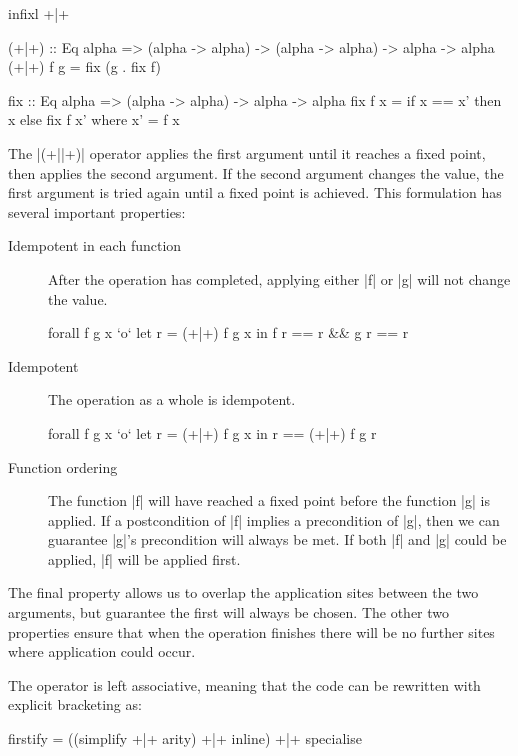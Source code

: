 \documentclass[preprint]{sigplanconf}
\begin{document}
\begin{code}
infixl +|+

(+|+) :: Eq alpha => (alpha -> alpha) -> (alpha -> alpha) -> alpha -> alpha
(+|+) f g = fix (g . fix f)

fix :: Eq alpha => (alpha -> alpha) -> alpha -> alpha
fix f x = if x == x' then x else fix f x'
    where x' = f x
\end{code}

The |(+||+)| operator applies the first argument until it reaches a fixed point, then applies the second argument. If the second argument changes the value, the first argument is tried again until a fixed point is achieved. This formulation has several important properties:

\begin{description}
\item[Idempotent in each function] After the operation has completed, applying either |f| or |g| will not change the value.

\begin{code}
forall f g x `o` let r = (+|+) f g x in f r == r && g r == r
\end{code}

\item[Idempotent] The operation as a whole is idempotent.

\begin{code}
forall f g x `o` let r = (+|+) f g x in r == (+|+) f g r
\end{code}

\item[Function ordering] The function |f| will have reached a fixed point before the function |g| is applied. If a postcondition of |f| implies a precondition of |g|, then we can guarantee |g|'s precondition will always be met. If both |f| and |g| could be applied, |f| will be applied first.
\end{description}

The final property allows us to overlap the application sites between the two arguments, but guarantee the first will always be chosen. The other two properties ensure that when the operation finishes there will be no further sites where application could occur.

The operator is left associative, meaning that the code can be rewritten with explicit bracketing as:

\begin{code}
firstify = ((simplify +|+ arity) +|+ inline) +|+ specialise
\end{code}
\end{document}
